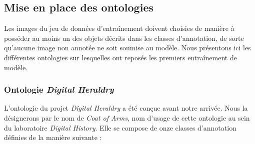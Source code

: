 \documentclass[12pt,twoside]{book}
\begin{document}
\subsection{Mise en place des ontologies}

Les images du jeu de données d’entraînement doivent choisies de manière à posséder au moins un des objets décrits dans les classes d’annotation, de sorte qu'aucune image non annotée ne soit soumise au modèle. Nous présentons ici les différentes ontologies sur lesquelles ont reposés les premiers entraînement de modèle. 

\subsubsection{Ontologie \textit{Digital Heraldry}}

L'ontologie du projet \textit{Digital Heraldry} a été conçue avant notre arrivée. Nous la désignerons par le nom de \textit{Coat of Arms}, nom d'usage de cette ontologie au sein du laboratoire \textit{Digital History}. Elle se compose de onze classes d'annotation définies de la manière suivante : \\ 
\end{document}

